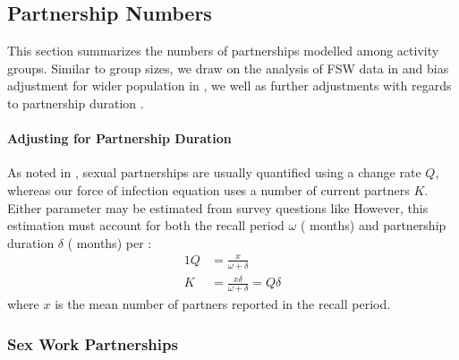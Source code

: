 \subsection{Partnership Numbers}\label{mod.par.pnum}
This section summarizes the numbers of partnerships modelled among activity groups.
Similar to group sizes, we draw on the
analysis of FSW data in  and
bias adjustment for wider population in ,
we well as further adjustments with regards to partnership duration \cite{Knight2023bias}.
\paragraph{Adjusting for Partnership Duration}
As noted in ,
sexual partnerships are usually quantified using a change rate $Q$,
whereas our force of infection equation uses a number of current partners $K$.
Either parameter may be estimated from survey questions like
However, this estimation must account for both the
recall period $\omega$ ( months) and
partnership duration $\delta$ ( months) per \cite{Knight2023bias}:
\begin{alignat}{1}
  Q &= \frac{x}{\omega+\delta} \label{eq:x2Q}\\
  K &= \frac{x\delta}{\omega+\delta} = Q\delta \label{eq:x2K}
\end{alignat}
where $x$ is the mean number of partners reported in the recall period.
\subsubsection{Sex Work Partnerships}\label{mod.par.pnum.sw}

